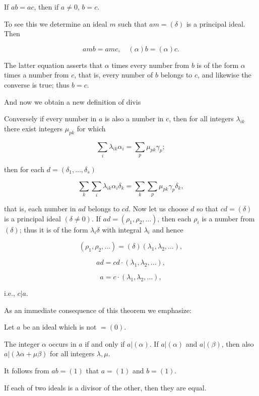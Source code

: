 If $ab = ac$, then if $a \neq 0$, $b = c$.

To see this we determine an ideal $m$ such that $am = (\delta)$ is a principal ideal. Then

$$amb = amc, \quad (\alpha)b = (\alpha)c.$$

The latter equation asserts that $\alpha$ times every number from $b$ is of the form $\alpha$ times a number from $c$, that is, every number of $b$ belongs to $c$, and likewise the converse is true; thus $b = c$.

And now we obtain a new definition of divis

Conversely if every number in $a$ is also a number in $c$, then for all integers $\lambda_{ik}$ there exist integers $\mu_{pk}$ for which

$$\sum_i \lambda_{ik} \alpha_i = \sum_p \mu_{pk} \gamma_p;$$

then for each $d = (\delta_1, \ldots, \delta_s)$

$$\sum_k \sum_i \lambda_{ik} \alpha_i \delta_k = \sum_k \sum_p \mu_{pk} \gamma_p \delta_k,$$

that is, each number in $a d$ belongs to $c d$. Now let us choose $d$ so that $c d = (\delta)$ is a principal ideal $(\delta \neq 0)$. If $a d = (\rho_1, \rho_2, \ldots)$, then each $\rho_i$ is a number from $(\delta)$; thus it is of the form $\lambda_i \delta$ with integral $\lambda_i$ and hence

$$(\rho_1, \rho_2, \ldots) = (\delta)(\lambda_1, \lambda_2, \ldots),$$

$$a d = c d \cdot (\lambda_1, \lambda_2, \ldots),$$

$$a = c \cdot (\lambda_1, \lambda_2, \ldots),$$

i.e., $c | a$.

As an immediate consequence of this theorem we emphasize:

Let $a$ be an ideal which is not $= (0)$.

The integer $\alpha$ occurs in $a$ if and only if $a | (\alpha)$. If $a | (\alpha)$ and $a | (\beta)$, then also $a | (\lambda \alpha + \mu \beta)$ for all integers $\lambda, \mu$.

It follows from $a b = (1)$ that $a = (1)$ and $b = (1)$.

If each of two ideals is a divisor of the other, then they are equal.
